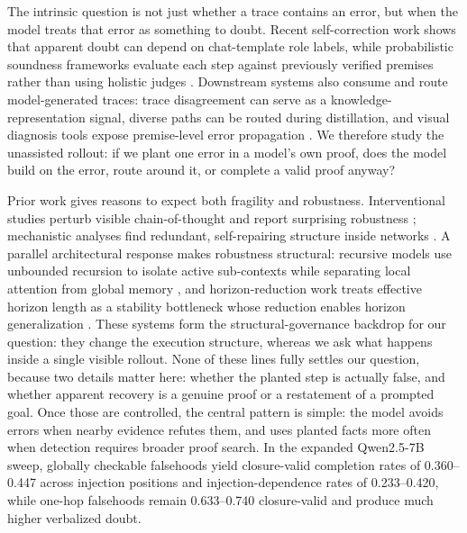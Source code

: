\documentclass{article}
\begin{document}
The intrinsic question is not just whether a trace contains an error, but when the
model treats that error as something to doubt. Recent self-correction work shows that
apparent doubt can depend on chat-template role labels, while probabilistic soundness
frameworks evaluate each step against previously verified premises rather than using
holistic judges \citep{chen2026selfcorrection,you2025probabilistic}. Downstream systems
also consume and route model-generated traces: trace disagreement can serve as a
knowledge-representation signal, diverse paths can be routed during distillation, and
visual diagnosis tools expose premise-level error propagation
\citep{wawer2026consensus,lei2025learning,chen2026chainbreaks}. We therefore study the
unassisted rollout: if we plant one error in a model's own proof, does the model build
on the error, route around it, or complete a valid proof anyway?

Prior work gives reasons to expect both fragility and robustness. Interventional
studies perturb visible chain-of-thought and report surprising robustness
\citep{vonrecum2026robust}; mechanistic analyses find redundant, self-repairing
structure inside networks \citep{mcgrath2023hydra,lad2024stages}. A parallel
architectural response makes robustness structural: recursive models use unbounded
recursion to isolate active sub-contexts while separating local attention from global memory
\citep{yang2026recursive}, and horizon-reduction work treats effective horizon length
as a stability bottleneck whose reduction enables horizon generalization
\citep{kim2026longhorizon}. These systems form the structural-governance backdrop for
our question: they change the execution structure, whereas we ask what happens inside a
single visible rollout. None of these lines fully settles our question, because two details matter here:
whether the planted step is actually false, and whether apparent recovery is a genuine
proof or a restatement of a prompted goal. Once those are controlled, the central
pattern is simple: the model avoids errors when nearby evidence refutes them, and uses
planted facts more often when detection requires broader proof search.
In the expanded Qwen2.5-7B sweep, globally checkable falsehoods yield
closure-valid completion rates of 0.360--0.447 across injection positions and
injection-dependence rates of 0.233--0.420, while one-hop falsehoods remain
0.633--0.740 closure-valid and produce much higher verbalized doubt.
\end{document}
